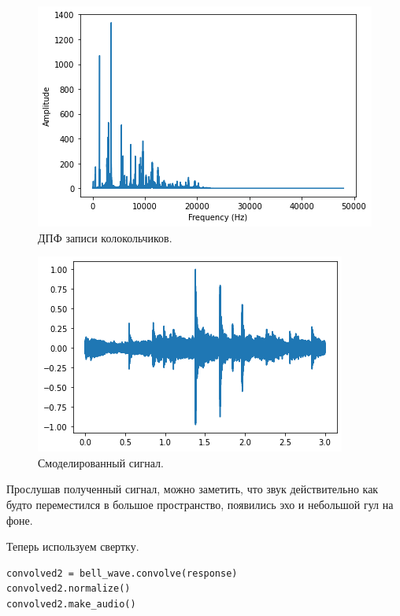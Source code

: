 \documentclass[a4paper, 14pt]{extarticle}
\begin{document}
    \begin{figure}[H]
        \centering
        \includegraphics[width=0.8\linewidth]{resources/Images/task2_bell_spectrum}
        \caption{ДПФ записи колокольчиков.}
        \label{fig:task2_bell_spectrum}
    \end{figure}

    \begin{figure}[H]
        \centering
        \includegraphics[width=0.8\linewidth]{resources/Images/task2_bell_result}
        \caption{Смоделированный сигнал.}
        \label{fig:task2_bell_result}
    \end{figure}

    Прослушав полученный сигнал, можно заметить, что звук действительно как будто переместился в большое пространство,
    появились эхо и небольшой гул на фоне.

    Теперь используем свертку.

    \begin{lstlisting}[caption= Использование свертки., label={lst:task2_bell_convolve}]
convolved2 = bell_wave.convolve(response)
convolved2.normalize()
convolved2.make_audio()
    \end{lstlisting}
\end{document}
